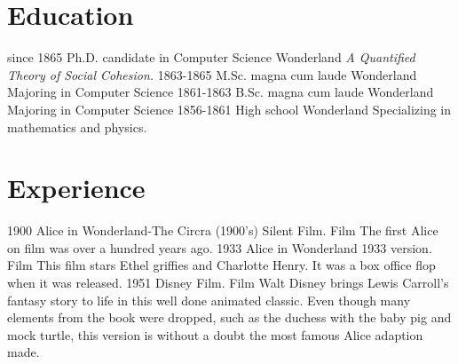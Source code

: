 \documentclass[letterpaper]{curriculum_vitae} %
\begin{document}


\makeprofile  %

\section{Education}

\begin{twenty}
  \twentyitem
    {since 1865}
    {Ph.D. {\normalfont candidate in Computer Science}}
    {Wonderland}
    {\emph{A Quantified Theory of Social Cohesion.}}
  \twentyitem
    {1863-1865}
    {M.Sc. magna cum laude}
    {Wonderland}
    {Majoring in Computer Science}
  \twentyitem
    {1861-1863}
    {B.Sc. magna cum laude}
    {Wonderland}
    {Majoring in Computer Science}
  \twentyitem
    {1856-1861}
    {High school}
    {Wonderland}
    {Specializing in mathematics and physics.}
\end{twenty}

\section{Experience}

\begin{twenty}
    \twentyitem
    {1900}
    {Alice in Wonderland-The Circra (1900's) Silent Film.}
    {Film}
    {The first Alice on film was over a hundred years ago.}
    \twentyitem
    {1933}
    {Alice in Wonderland 1933 version.}
    {Film}
    {This film stars Ethel griffies and Charlotte Henry. It was a box office flop when it was released.}
    \twentyitem
    {1951}
    {Disney Film.}
    {Film}
    {Walt Disney brings Lewis Carroll's fantasy story to life in this well done animated classic. Even though many elements from the book were dropped, such as the duchess with the baby pig and mock turtle, this version is without a doubt the most famous Alice adaption made.}
\end{twenty}
\end{document}
